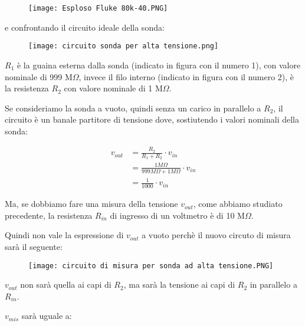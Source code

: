 \begin{figure}[h]
    \centering
    \texttt{[image: Esploso Fluke 80k-40.PNG]}
\end{figure}

e confrontando il circuito ideale della sonda: 

\begin{figure}[h]
    \centering
    \texttt{[image: circuito sonda per alta tensione.png]}
\end{figure}

$R_1$ è la guaina esterna dalla sonda (indicato in figura con il numero 1), con valore nominale di 999 M$\Omega$, 
invece il filo interno (indicato in figura con il numero 2), è la resistenza $R_2$ con valore nominale di 1 M$\Omega$. \newline 

Se consideriamo la sonda a vuoto, quindi senza un carico in parallelo a $R_2$, 
il circuito è un banale partitore di tensione dove, sostiutendo i valori nominali della sonda:

{
    \Large 
    \begin{equation}
        \begin{split}
            v_{out} 
            &= \frac{R_2}{R_1 + R_2} \cdot v_{in}
            \\
            &= \frac{1 M\Omega}{999 M\Omega + 1 M\Omega} \cdot v_{in}
            \\
            &= \frac{1}{1000} \cdot v_{in}
        \end{split}
    \end{equation}
}

Ma, se dobbiamo fare una misura della tensione $v_{out}$, 
come abbiamo studiato precedente, 
la resistenza $R_{in}$ di ingresso di un voltmetro è di 10 M$\Omega$. \newline 

Quindi non vale la espressione di $v_{out}$ a vuoto perchè il nuovo circuto di misura sarà il seguente: 

\begin{figure}[h]
    \centering
    \texttt{[image: circuito di misura per sonda ad alta tensione.PNG]}
\end{figure}

$v_{out}$ non sarà quella ai capi di $R_2$, ma sarà la tensione ai capi di $R_2$ in parallelo a $R_{in}$. \newline 

$v_{mis}$ sarà uguale a: 

